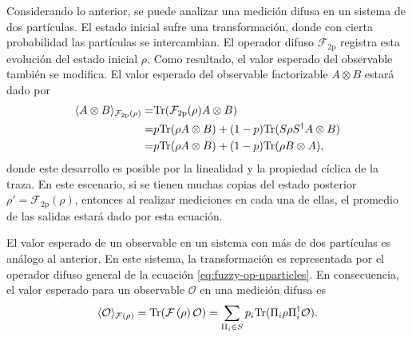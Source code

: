 Considerando lo anterior, se puede analizar una medición difusa en un sistema
de dos partículas.  El estado inicial sufre una transformación, donde  con cierta probabilidad las partículas se intercambian.  El operador difuso $\mathcal{F}_{2\text{p}}$
registra esta evolución del estado inicial $\rho$. Como resultado, el valor esperado del observable también se modifica. El valor esperado del
observable factorizable $A\otimes B$ estará dado por
{\cite{Pineda_2021}}\begin{equation}\label{eq:Expected-Value-FM-2p}
    \begin{split}
        \langle {A\otimes B}\rangle_{\mathcal{F}_{2\text{p}}(\rho)}=&{\rm Tr}(\mathcal{F}_{2\text{p}}(\rho)A\otimes B)\\
        =&p{\rm Tr}(\rho A\otimes B)+(1-p){\rm Tr}(S\rho S^\dagger A\otimes B)\\
        =& p{\rm Tr}(\rho A\otimes B)+(1-p){\rm Tr}(\rho B\otimes A),
    \end{split}
\end{equation}donde este desarrollo es posible por la linealidad y la propiedad cíclica de la traza.   En este escenario, si se tienen muchas copias del estado posterior $\rho'=\mathcal{F}_{2\text{p}}(\rho)$, entonces al realizar mediciones en cada una de ellas, el promedio de las salidas estará dado por esta ecuación. 

El valor esperado de un observable en un sistema con más de dos partículas es análogo al anterior. En este sistema, la transformación es representada por el operador difuso general de la ecuación {\eqref{eq:fuzzy-op-nparticles}}. En consecuencia, el valor esperado para un observable $\mathcal{O}$ en una medición difusa es\begin{equation}\label{eq:expected-value-fm-general}
    \langle \mathcal{O}\rangle_{\mathcal{F}\left(\rho\right)}={\rm Tr}(\mathcal{F}\left(\rho\right)\mathcal{O})=\sum_{\Pi_i\in S}p_i{\rm Tr}(\Pi_{i}\rho\Pi_{i}^{\dagger}\mathcal{O}).
\end{equation}



